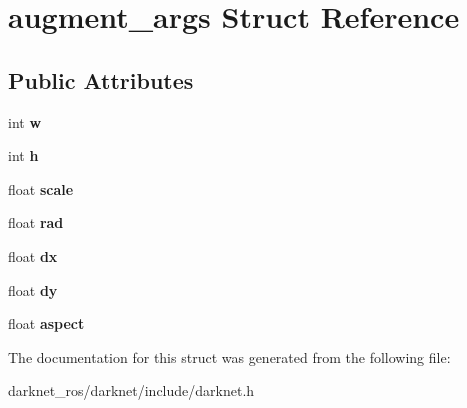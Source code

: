\hypertarget{structaugment__args}{}\section{augment\+\_\+args Struct Reference}
\label{structaugment__args}
\subsection*{Public Attributes}
\begin{DoxyCompactItemize}
\item 
\mbox{\label{structaugment__args_a974bba52935c8bd5e95a306d1bd88acd}} 
int {\bfseries w}
\item 
\mbox{\label{structaugment__args_afb11ad51cc544deb41ef00c118869612}} 
int {\bfseries h}
\item 
\mbox{\label{structaugment__args_a3bbc9156f890de21ce14876c552baaf2}} 
float {\bfseries scale}
\item 
\mbox{\label{structaugment__args_ad40390f9fe68f5079f95789b6673b2e9}} 
float {\bfseries rad}
\item 
\mbox{\label{structaugment__args_a74675af1ca9ba9cfc2f97da65fad1ff7}} 
float {\bfseries dx}
\item 
\mbox{\label{structaugment__args_aee2e7812e750cd312082426e3a2fc7a2}} 
float {\bfseries dy}
\item 
\mbox{\label{structaugment__args_aa5494cb275d1704ac87f9c6eca904453}} 
float {\bfseries aspect}
\end{DoxyCompactItemize}


The documentation for this struct was generated from the following file\+:\begin{DoxyCompactItemize}
\item 
darknet\+\_\+ros/darknet/include/darknet.\+h\end{DoxyCompactItemize}
